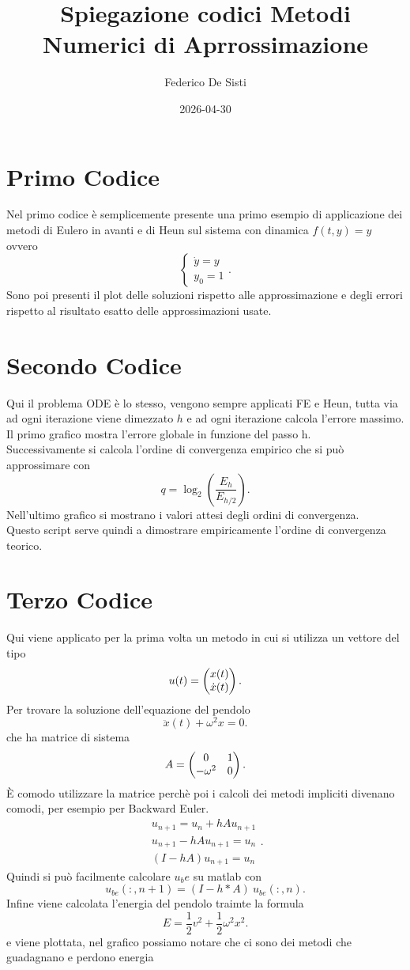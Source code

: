 \documentclass[12px]{article}
\title{Spiegazione codici Metodi Numerici di Aprrossimazione}
\date{2026-04-30}
\author{Federico De Sisti}
\begin{document}
	\maketitle
	\newpage
	\section{Primo Codice}
	Nel primo codice è semplicemente presente una primo esempio di applicazione dei metodi di Eulero in avanti e di Heun sul sistema con dinamica $f(t,y) = y$ ovvero
	 \[
	\begin{cases}
		\dot y = y\\
		y_0 =1
	\end{cases}
	.\] 
	Sono poi presenti il plot delle soluzioni rispetto alle approssimazione e degli errori rispetto al risultato esatto delle approssimazioni usate.
	\section{Secondo Codice}
	Qui il problema ODE è lo stesso, vengono sempre applicati FE e Heun, tutta via ad ogni iterazione viene dimezzato $h$ e ad ogni iterazione calcola l'errore massimo.\\
	Il primo grafico mostra l'errore globale in funzione del passo h.\\
	Successivamente si calcola l'ordine di convergenza empirico che si può approssimare con
	\[
		q = \log_2 \left(\frac{E_h}{E_{h/2}} \right)
	.\] 
	Nell'ultimo grafico si mostrano i valori attesi degli ordini di convergenza.\\
	Questo script serve quindi a dimostrare empiricamente l'ordine di convergenza teorico.
	\section{Terzo Codice}
	Qui viene applicato per la prima volta un metodo in cui si utilizza un vettore del tipo
	\[
		u(t) = \begin{pmatrix}x(t)\\\dot x(t)\end{pmatrix}
	.\] 
	Per trovare la soluzione dell'equazione del pendolo
	\[
	\ddot x(t) +\omega^2x= 0
	.\] 
	che ha matrice di sistema
	\[
		A = \begin{pmatrix}0 & 1\\
		-\omega^2 & 0\end{pmatrix}
	.\]
	È comodo utilizzare la matrice perchè poi i calcoli dei metodi impliciti divenano comodi, per esempio per Backward Euler.
	\[
		\begin{split}
		u_{n+1} = u_n + hAu_{n+1}\\
		u_{n+1} - hAu_{n+1} = u_n\\
		(I-hA)u_{n+1} = u_n
		\end{split}
	.\] 
	Quindi si può facilmente calcolare $u_be$ su matlab con 
	 \[
		 u_{be}(:,n+1) = (I-h*A) \ u_{be}(:,n)
	.\] 
	Infine viene calcolata l'energia del pendolo traimte la formula 
	\[
	E = \frac 12 v^2 + \frac 12 \omega^2 x^2
	.\] 
	e viene plottata, nel grafico possiamo notare che ci sono dei metodi che guadagnano e perdono energia\\
\end{document}
